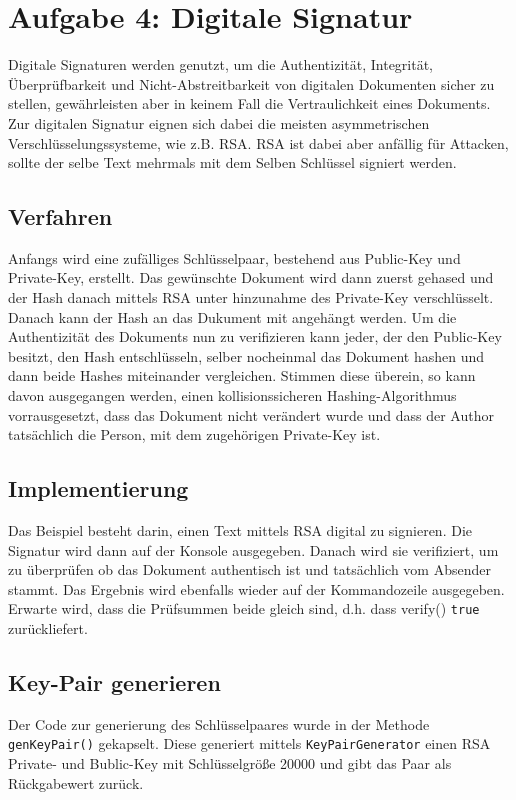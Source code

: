 \documentclass[12pt]{article}
\begin{document}
\section{Aufgabe 4: Digitale Signatur}
Digitale Signaturen werden genutzt, um die Authentizität, Integrität,
Überprüfbarkeit und Nicht-Abstreitbarkeit von digitalen
Dokumenten sicher zu stellen, gewährleisten aber in keinem Fall die Vertraulichkeit eines
Dokuments. Zur digitalen Signatur eignen sich dabei die meisten
asymmetrischen Verschlüsselungssysteme, wie z.B. RSA. RSA ist dabei aber anfällig für
Attacken, sollte der selbe Text mehrmals mit dem Selben Schlüssel signiert
werden.

\subsection{Verfahren}
Anfangs wird eine zufälliges Schlüsselpaar, bestehend aus Public-Key und
Private-Key, erstellt. Das gewünschte Dokument wird dann zuerst gehased 
und der Hash danach mittels RSA unter hinzunahme des Private-Key verschlüsselt.
Danach kann der Hash an das Dukument mit angehängt werden. Um die Authentizität
des Dokuments nun zu verifizieren kann jeder, der den Public-Key besitzt, den
Hash entschlüsseln, selber nocheinmal das Dokument hashen und dann beide Hashes
miteinander vergleichen. Stimmen diese überein, so kann davon ausgegangen
werden, einen kollisionssicheren Hashing-Algorithmus vorrausgesetzt, dass das
Dokument nicht verändert wurde und dass der Author tatsächlich die Person, mit
dem zugehörigen Private-Key ist.

\subsection{Implementierung}
Das Beispiel besteht darin, einen Text mittels RSA digital zu signieren. Die Signatur
wird dann auf der Konsole ausgegeben. Danach wird sie verifiziert, um zu
überprüfen ob das Dokument authentisch ist und tatsächlich vom Absender stammt. 
Das Ergebnis wird ebenfalls wieder auf der Kommandozeile ausgegeben. 
Erwarte wird, dass die Prüfsummen beide gleich sind, d.h. dass verify()
\texttt{true} zurückliefert.

\subsection{Key-Pair generieren}
Der Code zur generierung des Schlüsselpaares wurde in der Methode
\texttt{genKeyPair()} gekapselt. Diese generiert mittels
\texttt{KeyPairGenerator} einen RSA Private- und Bublic-Key mit Schlüsselgröße 20000
und gibt das Paar als Rückgabewert zurück.
\end{document}
